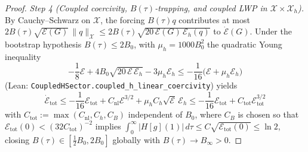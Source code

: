 \documentclass[11pt,a4paper]{article}
\begin{document}
\begin{proof}
\emph{Step 4 (Coupled coercivity, $B(\tau)$-trapping, and coupled LWP in $\mathcal{X}\times\mathcal{X}_h$).}
By Cauchy--Schwarz on $\mathcal{X}$, the forcing $B(\tau)q$ contributes at most
$2 B(\tau)\sqrt{\mathcal{E}(G)}\,\|q\|_{\mathcal{X}} \le 2 B(\tau)\sqrt{20\,\mathcal{E}(G)\,\mathcal{E}_h(q)}$
to $\dot{\mathcal{E}}(G)$.  Under the bootstrap hypothesis $B(\tau) \le 2 B_0$, with $\mu_h = 1000 B_0^2$
the quadratic Young inequality
\[
-\frac{1}{8}\mathcal{E} + 4 B_0\sqrt{20\,\mathcal{E}\,\mathcal{E}_h} - 3\mu_h\mathcal{E}_h
  \le -\frac{1}{16}\bigl(\mathcal{E} + \mu_h\mathcal{E}_h\bigr)
\]
(Lean: \texttt{CoupledHSector.\allowbreak coupled\_h\_linear\_coercivity}) yields
\[
\dot{\mathcal{E}}_{\mathrm{tot}}
  \le -\frac{1}{16}\mathcal{E}_{\mathrm{tot}}
    + C_{\mathrm{nl}}\mathcal{E}^{3/2} + \mu_h C_h\sqrt{\mathcal{E}}\,\mathcal{E}_h
  \le -\frac{1}{16}\mathcal{E}_{\mathrm{tot}} + C_{\mathrm{tot}}\mathcal{E}_{\mathrm{tot}}^{3/2}
\]
with $C_{\mathrm{tot}} := \max(C_{\mathrm{nl}}, C_h, C_B)$ independent of $B_0$, where $C_B$ is chosen so that
$\mathcal{E}_{\mathrm{tot}}(0) < (32 C_{\mathrm{tot}})^{-2}$ implies
$\int_0^\infty |H[g](1)|\,d\tau \le C\sqrt{\mathcal{E}_{\mathrm{tot}}(0)} \le \ln 2$, closing
$B(\tau) \in [\tfrac12 B_0, 2 B_0]$ globally with $B(\tau) \to B_\infty > 0$.


\end{proof}
\end{document}
